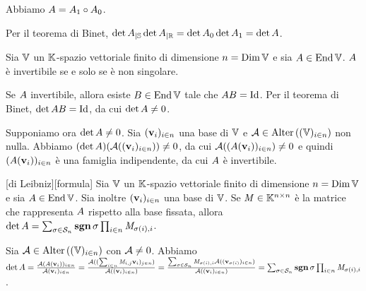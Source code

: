 Abbiamo
$A = A_1 \circ A_0$.
\par Per il teorema di Binet,
$\operatorname{det}{{A}_{|\mathbb{S}}}
\operatorname{det}{{A}_{|\mathbb{R}}}
= \operatorname{det}{A_0}\operatorname{det}{A_1}
= \operatorname{det}{A}$.
\EndProof
\begin{Corollary}
	Sia $\mathbb{V}$ un $\mathbb{K}$-spazio vettoriale finito di dimensione
  $n = \operatorname{\operatorname{Dim}}{\mathbb{V}}$ e sia
  $A \in \operatorname{End}{\mathbb{V}}$.
  $A$ \`e invertibile se e solo se \`e non singolare.
\end{Corollary}
\Proof Se $A$ invertibile, allora esiste
$B \in \operatorname{End}{\mathbb{V}}$ tale che
$\LinearTransformation\VarLinearTransformation = \Identity$.
Per il teorema di Binet,
$\Determinant{\LinearTransformation}{\VarLinearTransformation} = \Identity$, da
cui $\operatorname{det}{A} \neq 0$.
\par  Supponiamo ora
$\operatorname{det}{A} \neq 0$.
Sia $(\mathbf{v}_i)_{i \in n}$ una base di $\mathbb{V}$ e
$\mathcal{A} \in \text{Alter} \left ( (\mathbb{V})_{i \in n} \right )$ non nulla.
Abbiamo
$(\operatorname{det}{A})
(\mathcal{A}((\mathbf{v}_i)_{i \in n})) \neq 0$, da cui
$\mathcal{A}((A(\mathbf{v}_i))_{i \in n}) \neq 0$ e
quindi
$(A(\mathbf{v}_i))_{i \in n}$
\`e una famiglia indipendente, da cui $A$ \`e invertibile.
\EndProof
\begin{Theorem}
	[di Leibniz][formula] Sia $\mathbb{V}$ un $\mathbb{K}$-spazio vettoriale finito di dimensione $n = \operatorname{\operatorname{Dim}}{\mathbb{V}}$ e sia $A \in \operatorname{End}{\mathbb{V}}$. Sia inoltre $(\mathbf{v}_i)_{i \in n}$ una base di $\mathbb{V}$. Se $\mathit{M} \in \mathbb{K}^{n \times n}$ \`e la matrice che rappresenta $A$ rispetto alla base fissata, allora $\Determinant{\LinearTransformation} = \sum_{\Permutation \in \SymmetricGroup{n}} \PermutationSign{\Permutation} \prod_{i \in n} \Matrix_{\Permutation(i),i}$.
\end{Theorem}
\Proof Sia $\mathcal{A} \in \text{Alter} \left ( (\mathbb{V})_{i \in n} \right )$ con $\mathcal{A} \neq 0$. Abbiamo $\Determinant{\LinearTransformation} = \frac{\AlternatingForm{(\LinearTransformation(\LinearBase_i))_{i \in n}}}{\AlternatingForm{(\LinearBase_i)_{i \in n}}} = \frac{\AlternatingForm((\sum_{i \in n}\Matrix_{i,j}\LinearBase_i)_{j \in n})}{\AlternatingForm((\LinearBase_i)_{i \in n})} = \frac{\sum_{\Permutation \in \SymmetricGroup{n}} \Matrix_{\Permutation(i),i} \AlternatingForm((\LinearBase_{\Permutation(i)})_{i \in n})}{\AlternatingForm((\LinearBase_i)_{i \in n})} = \sum_{\Permutation \in \SymmetricGroup{n}} \PermutationSign{\Permutation} \prod_{i \in n} \Matrix_{\Permutation(i),i}$. \EndProof
